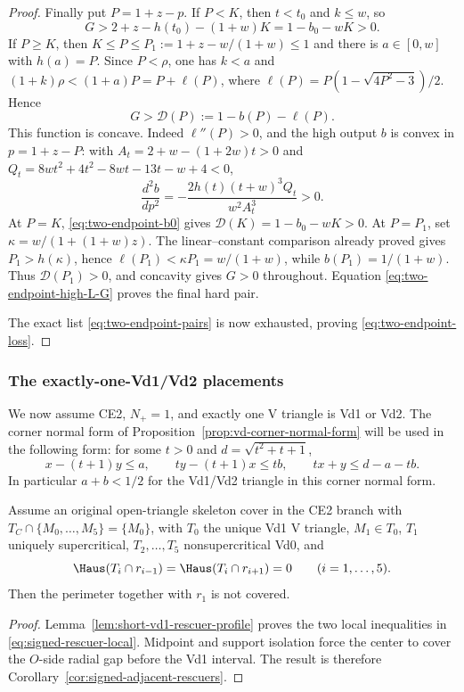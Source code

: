 \begin{proof}
Finally put $P=1+z-p$.  If $P<K$, then $t<t_0$ and $k\le w$, so
\[
 G>2+z-h(t_0)-(1+w)K=1-b_0-wK>0.
\]
If $P\ge K$, then $K\le P\le P_1:=1+z-w/(1+w)\le1$ and there is
$a\in[0,w]$ with $h(a)=P$. Since $P<\rho$, one has $k<a$ and
$(1+k)\rho<(1+a)P=P+\ell(P)$, where
$\ell(P)=P(1-\sqrt{4P^2-3})/2$.  Hence
\[
 G>\mathcal D(P):=1-b(P)-\ell(P).
\]
This function is concave.  Indeed $\ell''(P)>0$, and the high output $b$ is
convex in $p=1+z-P$: with
$A_t=2+w-(1+2w)t>0$ and
$Q_t=8wt^2+4t^2-8wt-13t-w+4<0$,
\[
 \frac{d^2b}{dp^2}=-\frac{2h(t)(t+w)^3Q_t}{w^2A_t^3}>0.
\]
At $P=K$, \eqref{eq:two-endpoint-b0} gives
$\mathcal D(K)=1-b_0-wK>0$.  At $P=P_1$, set
$\kappa=w/(1+(1+w)z)$.  The linear--constant comparison already proved gives
$P_1>h(\kappa)$, hence
$\ell(P_1)<\kappa P_1=w/(1+w)$, while $b(P_1)=1/(1+w)$.
Thus $\mathcal D(P_1)>0$, and concavity gives $G>0$ throughout.
Equation \eqref{eq:two-endpoint-high-L-G} proves the final hard pair.

The exact list \eqref{eq:two-endpoint-pairs} is now exhausted, proving
\eqref{eq:two-endpoint-loss}.
\end{proof}

\subsubsection{The exactly-one-Vd1/Vd2 placements}

We now assume CE2, $N_+=1$, and exactly one V triangle is Vd1 or Vd2.  The corner
normal form of Proposition~\ref{prop:vd-corner-normal-form} will be used in
the following form: for some $t>0$ and $d=\sqrt{t^2+t+1}$,
\begin{equation}
 x-(t+1)y\le a,\qquad ty-(t+1)x\le tb,\qquad
 tx+y\le d-a-tb.
 \label{eq:vd-corner-form}
\end{equation}
In particular $a+b<1/2$ for the Vd1/Vd2 triangle in this corner normal
form.

\begin{lemma}
\label{lem:vd1-adjacent-rescue}
Assume an original open-triangle skeleton cover in the CE2 branch with
$T_C\cap\{M_0,\ldots,M_5\}=\{M_0\}$,
with $T_0$ the unique Vd1 V triangle, $M_1\in T_0$, $T_1$ uniquely supercritical,
$T_2,\ldots,T_5$ nonsupercritical Vd0, and
\[
 \Haus(T_i\cap r_{i-1})=\Haus(T_i\cap r_{i+1})=0
 \qquad(i=1,\ldots,5).
\]
Then the perimeter together with $r_1$ is not covered.
\end{lemma}

\begin{proof}
Lemma~\ref{lem:short-vd1-rescuer-profile} proves the two local inequalities
in \eqref{eq:signed-rescuer-local}.  Midpoint and support isolation force the
center to cover the $O$-side radial gap before the Vd1 interval.  The result is
therefore Corollary~\ref{cor:signed-adjacent-rescuers}.
\end{proof}

